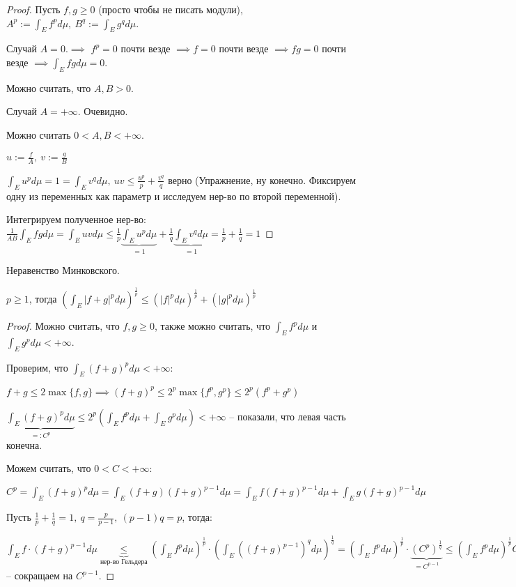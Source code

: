 \begin{proof}
    Пусть $f, g \geq 0$ (просто чтобы не писать модули), $A^p := \int_E f^p d \mu, \ B^q := \int_E g^q d \mu$.

    Случай $A = 0. \implies$ $f^p = 0$ почти везде $\implies f = 0$ почти везде $\implies f g  = 0$ почти везде $\implies \int_E f g d \mu = 0$.

    Можно считать, что $A, B > 0$.

    Случай $A = +\infty$. Очевидно.

    Можно считать $0 < A , B < +\infty$.
    
    $u := \frac{f}{A}, \ v:= \frac{g}{B}$

    $\int_E u^p d \mu = 1 = \int_E v^q d \mu, \ uv \leq \frac{u^p}{p} + \frac{v^q}{q}$ верно (Упражнение, ну конечно. Фиксируем одну из переменных как параметр и исследуем нер-во по второй переменной).

    Интегрируем полученное нер-во: $\frac{1}{AB} \int_E f g d \mu = \int_E u v d \mu \leq \frac{1}{p} \underbrace{\int_E u^p d \mu}_{=1} + \frac{1}{q} \underbrace{\int_E v^q d \mu}_{=1} = \frac{1}{p} + \frac{1}{q} = 1$ 
\end{proof}

\begin{properties}
    Неравенство Минковского.

    $p \geq 1$, тогда $\left(\int_E |f + g|^p d \mu\right)^{\frac{1}{p}} \leq \left( |f|^p d \mu \right)^{\frac{1}{p}} + \left( |g|^p d \mu \right)^{\frac{1}{p}}$
\end{properties}
\begin{proof}
    Можно считать, что $f, g \geq 0$, также можно считать, что $\int_E f^p d \mu$ и $\int_E g^p d \mu < +\infty$.

    Проверим, что $\int_E (f + g)^p d \mu < +\infty$:
    
    $f + g \leq 2 \max \{ f, g \} \implies (f + g)^p \leq 2^p \max\{ f^p, g^p \} \leq 2^p (f^p + g^p)$

    $\underbrace{\int_E (f + g)^p d \mu}_{=: C^p} \leq 2^p \left(\int_E f^p d \mu + \int_E g^p d \mu \right) < +\infty$ -- показали, что левая часть конечна.

    Можем считать, что $0 < C < +\infty$:
    
    $C^p = \int_E (f+g)^p d \mu = \int_E (f + g) (f + g)^{p - 1} d \mu = \int_E f (f+g)^{p-1} d \mu + \int_E g (f + g)^{p - 1} d \mu$


    Пусть $\frac{1}{p} + \frac{1}{q} = 1, \ q = \frac{p}{p-1}, \ (p - 1) q = p$, тогда:

    $\int_E{f \cdot (f + g)^{p - 1} d \mu} \underbrace{\leq}_{\text{нер-во Гельдера}} \left(\int_E f^p d \mu\right)^{\frac{1}{p}} \cdot \left(\int_E ((f+g)^{p-1})^{q} d \mu\right)^{\frac{1}{q}} = \left(\int_E f^p d \mu\right)^{\frac{1}{p}} \cdot \underbrace{\left(C^p\right)^{\frac{1}{q}}}_{= C^{p - 1}} \leq \left( \int_E f^p d \mu \right)^{\frac{1}{p}} C^{p - 1} + \left(\int_E g^p d \mu\right)^{\frac{1}{p}} \cdot C^{p - 1}$ -- сокращаем на $C^{p - 1}$.
\end{proof}

